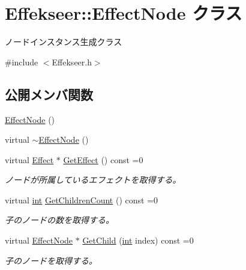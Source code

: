 \hypertarget{class_effekseer_1_1_effect_node}{}\section{Effekseer\+:\+:Effect\+Node クラス}
\label{class_effekseer_1_1_effect_node}


ノードインスタンス生成クラス  




{\ttfamily \#include $<$Effekseer.\+h$>$}

\subsection*{公開メンバ関数}
\begin{DoxyCompactItemize}
\item 
\mbox{\hyperlink{class_effekseer_1_1_effect_node_aba9378c17ee790783c2d2add7ec4c16c}{Effect\+Node}} ()
\item 
virtual \mbox{\hyperlink{class_effekseer_1_1_effect_node_a3f6d7251ef627dc4fa86e45c57989741}{$\sim$\+Effect\+Node}} ()
\item 
virtual \mbox{\hyperlink{class_effekseer_1_1_effect}{Effect}} $\ast$ \mbox{\hyperlink{class_effekseer_1_1_effect_node_a82cd29e3b7d4f56bae4f95d3ac1d25a7}{Get\+Effect}} () const =0
\begin{DoxyCompactList}\small\item\em ノードが所属しているエフェクトを取得する。 \end{DoxyCompactList}\item 
virtual \mbox{\hyperlink{namespace_effekseer_ace0abf7c2e6947e519ebe8b54cbcc30a}{int}} \mbox{\hyperlink{class_effekseer_1_1_effect_node_a195d5b29060452c7d4d4d5c376987c4f}{Get\+Children\+Count}} () const =0
\begin{DoxyCompactList}\small\item\em 子のノードの数を取得する。 \end{DoxyCompactList}\item 
virtual \mbox{\hyperlink{class_effekseer_1_1_effect_node}{Effect\+Node}} $\ast$ \mbox{\hyperlink{class_effekseer_1_1_effect_node_a8010add5e3aa304a0b600b558cb9cd5d}{Get\+Child}} (\mbox{\hyperlink{namespace_effekseer_ace0abf7c2e6947e519ebe8b54cbcc30a}{int}} index) const =0
\begin{DoxyCompactList}\small\item\em 子のノードを取得する。 \end{DoxyCompactList}\item 

\end{DoxyCompactItemize}
